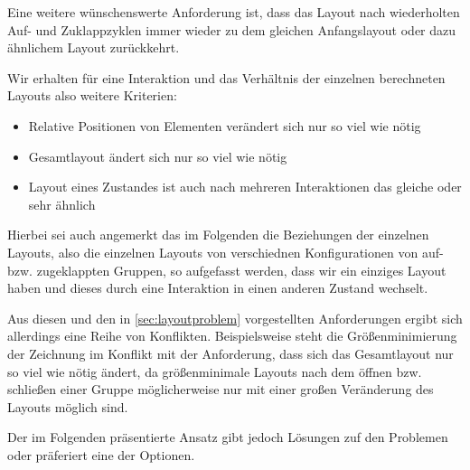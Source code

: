 Eine weitere wünschenswerte Anforderung ist, dass das Layout nach wiederholten Auf- und Zuklappzyklen immer wieder zu dem gleichen Anfangslayout oder dazu ähnlichem Layout zurückkehrt.

Wir erhalten für eine Interaktion und das Verhältnis der einzelnen berechneten Layouts also weitere Kriterien:
\begin{itemize}
\item Relative Positionen von Elementen verändert sich nur so viel wie nötig
\item Gesamtlayout ändert sich nur so viel wie nötig
\item Layout eines Zustandes ist auch nach mehreren Interaktionen das gleiche oder sehr ähnlich
\end{itemize}

Hierbei sei auch angemerkt das im Folgenden die Beziehungen der einzelnen Layouts, also die einzelnen Layouts von verschiednen Konfigurationen von auf- bzw. zugeklappten Gruppen, so aufgefasst werden, dass wir ein einziges Layout haben und dieses durch eine Interaktion in einen anderen Zustand wechselt.


Aus diesen und den in \autoref{sec:layoutproblem} vorgestellten Anforderungen ergibt sich allerdings eine Reihe von Konflikten.
Beispielsweise steht die Größenminimierung der Zeichnung im Konflikt mit der Anforderung, dass sich das Gesamtlayout nur so viel wie nötig ändert, 
da größenminimale Layouts nach dem öffnen bzw. schließen einer Gruppe möglicherweise nur mit einer großen Veränderung des Layouts möglich sind.

Der im Folgenden präsentierte Ansatz gibt jedoch Lösungen zuf den Problemen oder präferiert eine der Optionen.




